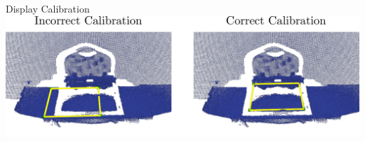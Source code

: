 \begin{figureBox}[label={fig:calibration}, width=0.65\linewidth]{Display Calibration}
    \includegraphics[width=1.0\linewidth]{./implementation/figures/calibration.pdf}
\end{figureBox}

